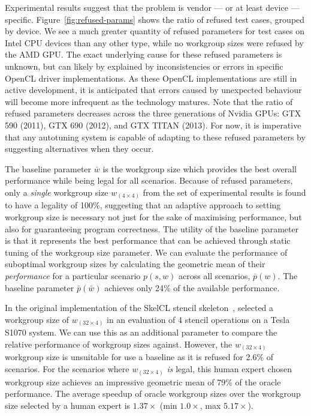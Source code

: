 \documentclass[nonatbib,preprint,10pt]{sigplanconf}
\begin{document}
Experimental results suggest that the problem is vendor --- or at
least device --- specific. Figure~\ref{fig:refused-params} shows the
ratio of refused test cases, grouped by device. We see a much greater
quantity of refused parameters for test cases on Intel CPU devices
than any other type, while no workgroup sizes were refused by the AMD
GPU. The exact underlying cause for these refused parameters is
unknown, but can likely by explained by inconsistencies or errors in
specific OpenCL driver implementations. As these OpenCL
implementations are still in active development, it is anticipated
that errors caused by unexpected behaviour will become more infrequent
as the technology matures. Note that the ratio of refused parameters
decreases across the three generations of Nvidia GPUs: GTX 590 (2011),
GTX 690 (2012), and GTX TITAN (2013). For now, it is imperative that
any autotuning system is capable of adapting to these refused
parameters by suggesting alternatives when they occur.

The baseline parameter $\bar{w}$ is the workgroup size which provides
the best overall performance while being legal for all
scenarios. Because of refused parameters, only a \emph{single}
workgroup size $w_{(4 \times 4)}$ from the set of experimental results
is found to have a legality of 100\%, suggesting that an adaptive
approach to setting workgroup size is necessary not just for the sake
of maximising performance, but also for guaranteeing program
correctness. The utility of the baseline parameter is that it
represents the best performance that can be achieved through static
tuning of the workgroup size parameter. We can evaluate the
performance of suboptimal workgroup sizes by calculating the geometric
mean of their \emph{performance} for a particular scenario $p(s, w)$
across all scenarios, $\bar{p}(w)$. The baseline parameter
$\bar{p}(\bar{w})$ achieves only 24\% of the available performance.

In the original implementation of the SkelCL stencil
skeleton~\cite{Breuer2014a}, \citeauthor{Breuer2014a} selected a
workgroup size of $w_{(32 \times 4)}$ in an evaluation of 4 stencil
operations on a Tesla S1070 system. We can use this as an additional
parameter to compare the relative performance of workgroup sizes
against. However, the $w_{(32 \times 4)}$ workgroup size is unsuitable
for use a baseline as it is refused for 2.6\% of scenarios. For the
scenarios where $w_{(32 \times 4)}$ \emph{is} legal, this human expert
chosen workgroup size achieves an impressive geometric mean of 79\% of
the oracle performance. The average speedup of oracle workgroup sizes
over the workgroup size selected by a human expert is $1.37\times$
(min $1.0\times$, max $5.17\times$).
\end{document}
